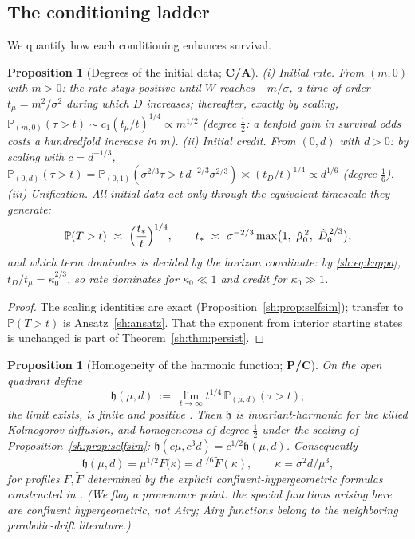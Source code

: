 \documentclass[11pt]{article}
\numberwithin{equation}{section}
\theoremstyle{plain}
\newtheorem{proposition}[theorem]{Proposition}
\theoremstyle{definition}
\theoremstyle{remark}
\newcommand{\PP}{\mathbb{P}}
\newcommand{\hm}{\mathfrak{h}}
\begin{document}
\subsection{The conditioning ladder}\label{sh:subsub:ladder}

We quantify how each conditioning enhances survival.

\begin{proposition}[Degrees of the initial data; \textbf{C/A}]
\label{sh:prop:degrees}
\emph{(i) Initial rate.} From $(m,0)$ with $m>0$: the rate stays positive
until $W$ reaches $-m/\sigma$, a time of order $t_\mu=m^2/\sigma^2$ during
which $D$ increases; thereafter, exactly by scaling,
$\PP_{(m,0)}(\tau>t)\sim c_1(t_\mu/t)^{1/4}\propto m^{1/2}$
\emph{(degree $\tfrac12$: a tenfold gain in survival odds costs a
hundredfold increase in $m$)}.
\emph{(ii) Initial credit.} From $(0,d)$ with $d>0$: by scaling with
$c=d^{-1/3}$, $\PP_{(0,d)}(\tau>t)=\PP_{(0,1)}(\sigma^{2/3}\tau>
t\,d^{-2/3}\sigma^{2/3})\asymp(t_D/t)^{1/4}\propto d^{1/6}$
\emph{(degree $\tfrac16$)}.
\emph{(iii) Unification.} All initial data act only through the equivalent
timescale they generate:
\begin{equation}\label{sh:eq:tstar}
\PP(T>t)\ \asymp\ \Bigl(\frac{t_*}{t}\Bigr)^{1/4},\qquad
t_*\ \asymp\ \sigma^{-2/3}\max\bigl(1,\ \hat\mu_0^{\,2},\ \hat
D_0^{\,2/3}\bigr),
\end{equation}
and which term dominates is decided by the horizon coordinate: by
\eqref{sh:eq:kappa}, $t_D/t_\mu=\kappa_0^{2/3}$, so rate dominates for
$\kappa_0\ll1$ and credit for $\kappa_0\gg1$.
\end{proposition}

\begin{proof}
The scaling identities are exact (Proposition~\ref{sh:prop:selfsim});
transfer to $\PP(T>t)$ is Ansatz~\ref{sh:ansatz}. That the exponent from
interior starting states is unchanged is part of
Theorem~\ref{sh:thm:persist}.
\end{proof}

\begin{proposition}[Homogeneity of the harmonic function; \textbf{P/C}]
\label{sh:prop:harmonic}
On the open quadrant define
\[
\hm(\mu,d)\ :=\ \lim_{t\to\infty}t^{1/4}\,\PP_{(\mu,d)}(\tau>t);
\]
the limit exists, is finite and positive \cite{IW94,GJW99}. Then $\hm$ is
invariant-harmonic for the killed Kolmogorov diffusion, and homogeneous
of degree $\tfrac12$ under the scaling of
Proposition~\ref{sh:prop:selfsim}: $\hm(c\mu,c^3d)=c^{1/2}\hm(\mu,d)$.
Consequently
\begin{equation}\label{sh:eq:harm}
\hm(\mu,d)=\mu^{1/2}F\bigl(\kappa\bigr)=d^{1/6}\tilde F(\kappa),
\qquad \kappa=\sigma^2d/\mu^3,
\end{equation}
for profiles $F,\tilde F$ determined by the explicit
confluent-hypergeometric formulas constructed in \cite{GJW99}. (We flag
a provenance point: the special functions arising here are confluent
hypergeometric, not Airy; Airy functions belong to the neighboring
parabolic-drift literature.)
\end{proposition}
\end{document}
